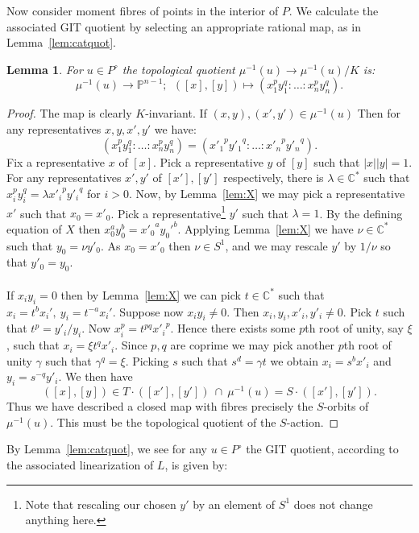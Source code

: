 \documentclass{amsart}
\newtheorem{lemma}[theorem]{Lemma}
\theoremstyle{definition}
\newcommand{\CC}{\mathbb{C}}
\newcommand{\PP}{\mathbb{P}}
\begin{document}
%
%
%
Now consider moment fibres of points in the interior of \(P\). We calculate the associated GIT quotient by selecting an appropriate rational map, as in Lemma~\ref{lem:catquot}.
\begin{lemma} \label{lem:3.3}
For \(u \in P^\circ\) the topological quotient \(\mu^{-1}(u) \to \mu^{-1}(u)/K \) is:
\[
\mu^{-1}(u) \to \PP^{n-1}; \ \ ([x],[y]) \mapsto (x_1^p y_1^q: \dots : x_n^p y_n^q ).
\]
\end{lemma}
%
%
%
\begin{proof}
The map is clearly \(K\)-invariant. If \((x,y), ({x'},{y'}) \in \mu^{-1}(u)\) Then for any representatives \(x,y,{x'},{y'}\) we have:
\[
(x_1^p y_1^q: \dots : x_n^p y_n^q) = ({x'_1}^p {y'_1}^q: \dots : {x'_n}^p {y'_n}^q).
\]
Fix a representative \(x\) of \([x]\). Pick a representative \(y\) of \([y]\) such that \(|x||y| = 1\). For any representatives \({x'},{y'}\) of \([x'],[y']\) respectively, there is \(\lambda \in \CC^*\) such that \( x_i^p y_i^q = \lambda {{x'_i}}^p {{y'_i}}^q\) for \(i>0\). Now, by Lemma~\ref{lem:X} we may pick a representative \({x'}\) such that \(x_0 = {{x'_0}}\). Pick a representative\footnote{Note that rescaling our chosen \({y'}\) by an element of \(S^1\) does not change anything here.} \({y'}\) such that \(\lambda = 1\). By the defining equation of \(X\) then  \(x_0^a y_0^b = {x'_0}^a {y_0'}^b \). Applying Lemma~\ref{lem:X} we have \(\nu \in \CC^*\) such that \(y_0 = \nu{y'_0}\). As \(x_0 = {x'_0}\) then \(\nu \in S^1\), and we may rescale \({y'}\) by \(1/\nu\) so that \({y'_0} = y_0\).
\\ \\
If \(x_iy_i = 0\) then by Lemma~\ref{lem:X} we can pick \(t \in \CC^*\) such that \(x_i = t^b x_i', \ y_i = t^{-a} x_i'\). Suppose now \(x_iy_i \neq 0\). Then \(x_i,y_i,{x'_i},{y'_i} \neq 0\).
%
%
%
%
Pick \(t\) such that \(t^p = {y'_i}/y_i\). Now \(x_i^p = t^{p q} {x'_i}^p\). Hence there exists some \(p\)th root of unity, say \(\xi\), such that \(x_i = \xi t^q {x'_i}\). Since \(p,q\) are coprime we may pick another \(p\)th root of unity \(\gamma\) such that \(\gamma^q = \xi\). Picking \(s\) such that \(s^d = \gamma t\) we obtain \(x_i = s^b {x'}_i\) and \(y_i = s^{-q} {y'_i}\). We then have
\[
([x],[y]) \in T \cdot ([x'],[y']) \ \cap \ \mu^{-1}(u) = S \cdot ([x'],[y']).
\]
Thus we have described a closed map with fibres precisely the \(S\)-orbits of \(\mu^{-1}(u)\). This must be the topological quotient of the \(S\)-action.
\end{proof}
%
%
%
By Lemma~\ref{lem:catquot}, we see for any \(u \in P^\circ\) the GIT quotient, according to the associated linearization of \(L\), is given by:
\end{document}
